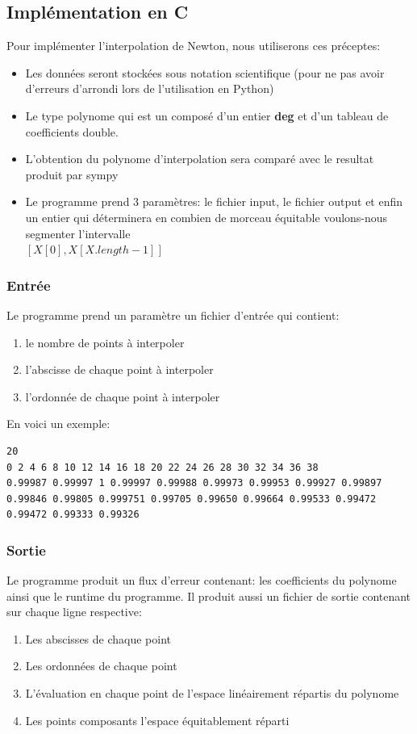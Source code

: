 \subsection{Implémentation en C}
Pour implémenter l'interpolation de Newton, nous utiliserons ces préceptes:
\begin{itemize}
\item Les données seront stockées sous notation scientifique (pour ne pas avoir d'erreurs d'arrondi lors de l'utilisation en Python)
\item Le type polynome qui est un composé d'un entier \textbf{deg} et d'un tableau de coefficients double.
\item L'obtention du polynome d'interpolation sera comparé avec le resultat produit par sympy
\item Le programme prend 3 paramètres: le fichier input, le fichier output et enfin un entier qui déterminera en combien de morceau équitable voulons-nous segmenter l'intervalle \\
$[X[0], X[X.length-1]]$ 
\end{itemize}
\subsubsection{Entrée}
Le programme prend un paramètre un fichier d'entrée qui contient:
\begin{enumerate}
\item le nombre de points à interpoler
\item l'abscisse de chaque point à interpoler
\item l'ordonnée de chaque point à interpoler
\end{enumerate}
En voici un exemple: 
\begin{lstlisting}[mathescape=true, frame=single, basicstyle=\linespread{1.5}\fontsize{8}{10}\selectfont, caption="41.txt"]
20
0 2 4 6 8 10 12 14 16 18 20 22 24 26 28 30 32 34 36 38
0.99987 0.99997 1 0.99997 0.99988 0.99973 0.99953 0.99927 0.99897 
0.99846 0.99805 0.999751 0.99705 0.99650 0.99664 0.99533 0.99472 
0.99472 0.99333 0.99326
\end{lstlisting}
\subsubsection{Sortie}
Le programme produit un flux d'erreur contenant: les coefficients du polynome ainsi que le runtime du programme.
Il produit aussi un fichier de sortie contenant sur chaque ligne respective:
\begin{enumerate}
\item Les abscisses de chaque point
\item Les ordonnées de chaque point
\item L'évaluation en chaque point de l'espace linéairement répartis du polynome 
\item Les points composants l'espace équitablement réparti
\end{enumerate}
\newpage
